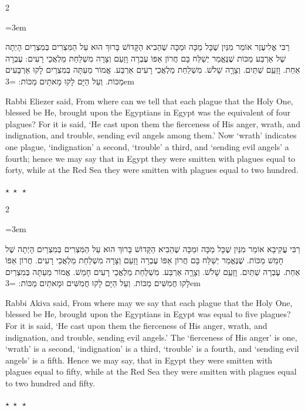 \documentclass[11pt, openany]{book}
\newcommand{\sederdivider}{%
  \par\vspace{6pt}
  \begin{center}
    \textcolor{sedergold}{\large$\star\;\star\;\star$}
  \end{center}
  \par\vspace{6pt}
}
\newenvironment{bilingual}{%
  \par\vspace{4pt}%
  \begin{paracol}{2}%
}{%
  \end{paracol}%
  \par\vspace{2pt}%
}
\newenvironment{hebrewcol}{%
  \switchcolumn[1]%
  \begingroup
  \RTL
  \hebrewfont\large
  \setstretch{1.4}%
  \emergencystretch=3em
  \tolerance=9999
  \parindent=0pt\relax
}{%
  \endRTL
  \endgroup
}
\newenvironment{englishcol}{%
  \switchcolumn[0]%
  \begingroup
  \setstretch{1.4}%
  \emergencystretch=3em
  \tolerance=9999
  \normalsize
  \rightskip=0.12in\relax
}{%
  \endgroup
}
\newcommand{\parasep}{%
  \par\vspace{3pt}
  \begin{center}
    \textcolor{sedergold!50}{\small$\star\;\star\;\star$}
  \end{center}
  \par\vspace{3pt}
}
\begin{document}
\begin{bilingual}
\begin{hebrewcol}
רַבִּי אֱלִיעֶזֶר אוֹמֵר מִנַּיִן שֶׁכָּל מַכָּה וּמַכָּה שֶׁהֵבִיא הַקָּדוֹשׁ בָּרוּךְ הוּא עַל הַמִּצְרִים בְּמִצְרַיִם הָיְתָה שֶׁל אַרְבַּע מַכּוֹת שֶׁנֶּאֱמַר יְשַׁלַּח בָּם חֲרוֹן אַפּוֹ עֶבְרָה וָזַעַם וְצָרָה מִשְׁלַחַת מַלְאֲכֵי רָעִים: עֶבְרָה אַחַת. וָזַעַַם שְׁתַּיִם. וְצָרָָה שָׁלֹשׁ. מִשְׁלַחַת מַלְאֲכֵי רָעִים אַרְבַּע. אֱמוֹר מֵעַתָּה בְּמִצְרַיִם לָקוּ אַרְבָּעִים מַכּוֹת. וְעַל הַיָּם לָקוּ מָאתַיִם מַכּוֹת:
\end{hebrewcol}
\begin{englishcol}
Rabbi Eliezer said, From where can we tell that each plague that the Holy One, blessed be He, brought upon the Egyptians in Egypt was the equivalent of four plagues? For it is said, ‘He cast upon them the fierceness of His anger, wrath, and indignation, and trouble, sending evil angels among them.’ Now ‘wrath’ indicates one plague, ‘indignation’ a second, ‘trouble’ a third, and ‘sending evil angels’ a fourth; hence we may say that in Egypt they were smitten with plagues equal to forty, while at the Red Sea they were smitten with plagues equal to two hundred.
\end{englishcol}
\end{bilingual}
\parasep

\begin{bilingual}
\begin{hebrewcol}
רַבִּי עֲקִיבָא אוֹמֵר מִנַּיִן שֶׁכָּל מַכָּה וּמַכָּה שֶׁהֵבִיא הַקָּדוֹשׁ בָּרוּךְ הוּא עַל הַמִּצְרִים בְּמִצְרַיִם הָיְתָה שֶׁל חָמֵשׁ מַכּוֹת. שֶׁנֶּאֱמַר יְשַׁלַּח בָּם חֲרוֹן אַפּוֹ עֶבְרָה וָזַעַם וְצָרָה מִשְׁלַחַת מַלְאֲכֵי רָעִים. חֲרוֹן אַפּוֹ אַחַת. עֶבְרָה שְׁתַּיִם. וָזַעַַם שָׁלֹשׁ. וְצָרָָה אַרְבַּע. מִשְׁלַחַת מַלְאֲכֵי רָעִים חָמֵשׁ. אֱמוֹר מֵעַתָּה בְּמִצְרַיִם לָקוּ חֲמִשִּׁים מַכּוֹת. וְעַל הַיָּם לָקוּ חֲמִשִּׁים וּמָאתַיִם מַכּוֹת:
\end{hebrewcol}
\begin{englishcol}
Rabbi Akiva said, From where may we say that each plague that the Holy One, blessed be He, brought upon the Egyptians in Egypt was equal to five plagues? For it is said, ‘He cast upon them the fierceness of His anger, wrath, and indignation, and trouble, sending evil angels.’ The ‘fierceness of His anger’ is one, ‘wrath’ is a second, ‘indignation’ is a third, ‘trouble’ is a fourth, and ‘sending evil angels’ is a fifth. Hence we may say, that in Egypt they were smitten with plagues equal to fifty, while at the Red Sea they were smitten with plagues equal to two hundred and fifty.
\end{englishcol}
\end{bilingual}
\sederdivider
\end{document}

